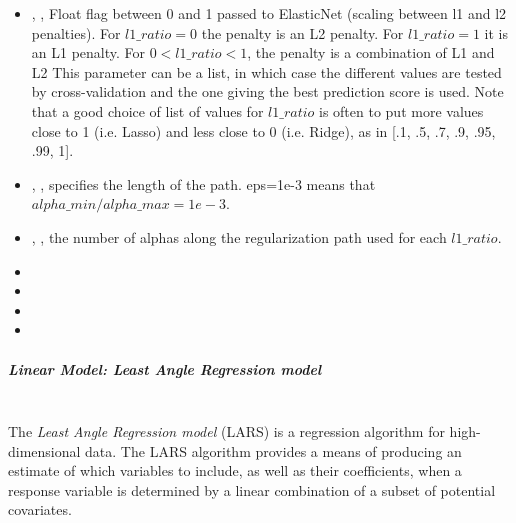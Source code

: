 \begin{itemize}
  \item {}, ,
  Float flag between 0 and 1 passed to ElasticNet (scaling between l1 and l2
  penalties).
  For $l1\_ratio = 0$ the penalty is an L2 penalty.
  For $l1\_ratio = 1$ it is an L1 penalty.
  For $0 < l1\_ratio < 1$, the penalty is a combination of L1 and L2 This
  parameter can be a list, in which case the different values are tested by
  cross-validation and the one giving the best prediction score is used.
  Note that a good choice of list of values for $l1\_ratio$ is often to put more
  values close to 1 (i.e. Lasso) and less close to 0 (i.e. Ridge), as in [.1,
  .5, .7, .9, .95, .99, 1].
  \item {}, , specifies the length of 
  the path.
  eps=1e-3 means that $alpha\_min / alpha\_max = 1e-3$.
  \item {}, , the number of
  alphas along the regularization path used for each $l1\_ratio$.
  \item {}
  \item {}
  \item {}
  \item {}
\end{itemize}
\subparagraph{Linear Model: Least Angle Regression model}
\mbox{}
\\The \textit{Least Angle Regression model} (LARS) is a regression algorithm for
high-dimensional data.
%
The LARS algorithm provides a means of producing an estimate of which variables
to include, as well as their coefficients, when a response variable is
determined by a linear combination of a subset of potential covariates.
%

